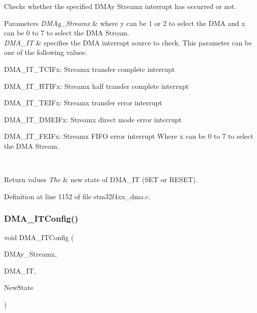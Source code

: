 Checks whether the specified D\+M\+Ay Streamx interrupt has occurred or not. 


\begin{DoxyParams}{Parameters}
{\em D\+M\+Ay\+\_\+\+Streamx} & where y can be 1 or 2 to select the D\+MA and x can be 0 to 7 to select the D\+MA Stream. \\
\hline
{\em D\+M\+A\+\_\+\+IT} & specifies the D\+MA interrupt source to check. This parameter can be one of the following values\+: \begin{DoxyItemize}
\item D\+M\+A\+\_\+\+I\+T\+\_\+\+T\+C\+I\+Fx\+: Streamx transfer complete interrupt \item D\+M\+A\+\_\+\+I\+T\+\_\+\+H\+T\+I\+Fx\+: Streamx half transfer complete interrupt \item D\+M\+A\+\_\+\+I\+T\+\_\+\+T\+E\+I\+Fx\+: Streamx transfer error interrupt \item D\+M\+A\+\_\+\+I\+T\+\_\+\+D\+M\+E\+I\+Fx\+: Streamx direct mode error interrupt \item D\+M\+A\+\_\+\+I\+T\+\_\+\+F\+E\+I\+Fx\+: Streamx F\+I\+FO error interrupt Where x can be 0 to 7 to select the D\+MA Stream. \end{DoxyItemize}
\\
\hline
\end{DoxyParams}

\begin{DoxyRetVals}{Return values}
{\em The} & new state of D\+M\+A\+\_\+\+IT (S\+ET or R\+E\+S\+ET). \\
\hline
\end{DoxyRetVals}


Definition at line 1152 of file stm32f4xx\+\_\+dma.\+c.

\mbox{\label{group___d_m_a___group4_gab9c469a3f5d4aca5c97dee798ffc2f05}} 
\subsubsection{\texorpdfstring{D\+M\+A\+\_\+\+I\+T\+Config()}{DMA\_ITConfig()}}
{\footnotesize\ttfamily void D\+M\+A\+\_\+\+I\+T\+Config (\begin{DoxyParamCaption}\item[{\hyperlink{struct_d_m_a___stream___type_def}{D\+M\+A\+\_\+\+Stream\+\_\+\+Type\+Def} $\ast$}]{D\+M\+Ay\+\_\+\+Streamx,  }\item[{uint32\+\_\+t}]{D\+M\+A\+\_\+\+IT,  }\item[{Functional\+State}]{New\+State }\end{DoxyParamCaption})}



